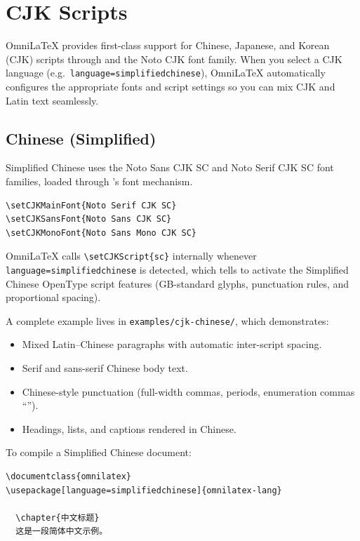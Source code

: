 \chapter{CJK Scripts}
\label{ch:cjk}

OmniLaTeX provides first-class support for Chinese, Japanese, and Korean (CJK)
scripts through  and the Noto CJK font family.  When you select
a CJK language (e.g.\ \texttt{language=simplifiedchinese}), OmniLaTeX
automatically configures the appropriate fonts and script settings so you can
mix CJK and Latin text seamlessly.

\section{Chinese (Simplified)}

Simplified Chinese uses the Noto Sans CJK SC and Noto Serif CJK SC font
families, loaded through 's font mechanism.

\begin{verbatim}
\setCJKMainFont{Noto Serif CJK SC}
\setCJKSansFont{Noto Sans CJK SC}
\setCJKMonoFont{Noto Sans Mono CJK SC}
\end{verbatim}

OmniLaTeX calls \verb|\setCJKScript{sc}| internally whenever
\texttt{language=simplifiedchinese} is detected, which tells 
to activate the Simplified Chinese OpenType script features (GB-standard
glyphs, punctuation rules, and proportional spacing).

A complete example lives in \texttt{examples/cjk-chinese/}, which
demonstrates:

\begin{itemize}
  \item Mixed Latin--Chinese paragraphs with automatic inter-script spacing.
  \item Serif and sans-serif Chinese body text.
  \item Chinese-style punctuation (full-width commas, periods, enumeration
        commas ``'').
  \item Headings, lists, and captions rendered in Chinese.
\end{itemize}

To compile a Simplified Chinese document:

\begin{verbatim}
\documentclass{omnilatex}
\usepackage[language=simplifiedchinese]{omnilatex-lang}

  \chapter{中文标题}
  这是一段简体中文示例。

\end{verbatim}

